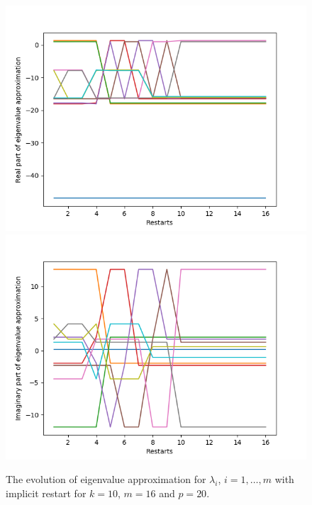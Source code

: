 \begin{figure}[h!]
\centering
\includegraphics[scale=0.4]{../task7/task7b1_k10m16p20.png}
\includegraphics[scale=0.4]{../task7/task7b2_k10m16p20.png}
\caption{The evolution of eigenvalue approximation for $\lambda_{i}$, $i = 1,\ldots,m$ with implicit restart for $k = 10$, $m=16$ and $p = 20$.}
\label{fig:task7b1k10}
\end{figure}


